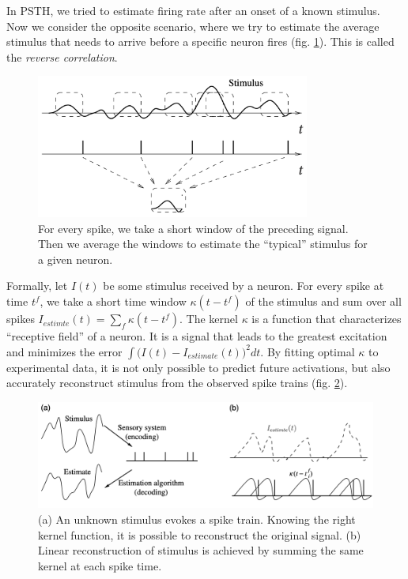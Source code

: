 \documentclass[12pt]{article}
\begin{document}
In PSTH, we tried to estimate firing rate after an onset of a known stimulus. Now we consider the opposite scenario, where we  try to estimate the average stimulus that needs to arrive before a specific neuron fires (fig. \ref{fig:reverse_correlation}). This is called the \textit{reverse correlation}.
\begin{figure}[!htbp]
	\centering
	\includegraphics[width=9cm]{reverse_correlation}
	\caption{For every spike, we take a short window of the preceding signal. Then we average the windows to estimate the ``typical'' stimulus for a given neuron.}
	\label{fig:reverse_correlation}
\end{figure}
Formally, let $I(t)$ be some stimulus received by a neuron. For every spike at time $t^f$, we take a short time window $\kappa(t-t^f)$ of the stimulus and sum over all spikes $I_{estimte}(t)=\sum_f \kappa(t-t^f)$. The kernel $\kappa$ is a function that characterizes ``receptive field'' of a neuron. It is a signal that leads to the greatest excitation and minimizes the error $\int \big(I(t)-I_{estimate}(t)\big)^2dt$. By fitting optimal $\kappa$ to experimental data, it is not only possible to predict future activations, but also accurately reconstruct stimulus from the observed spike trains (fig. \ref{fig:reverse_correlation_estimate}).
\begin{figure}[!htbp]
	\centering
	\includegraphics[width=13cm]{reverse_correlation_estimate}
	\caption{(a)  An unknown stimulus evokes a spike train. Knowing the right kernel function, it is possible to reconstruct the original signal. (b) Linear reconstruction of stimulus is achieved by summing the same kernel at each spike time.}
	\label{fig:reverse_correlation_estimate}
\end{figure}
\end{document}
